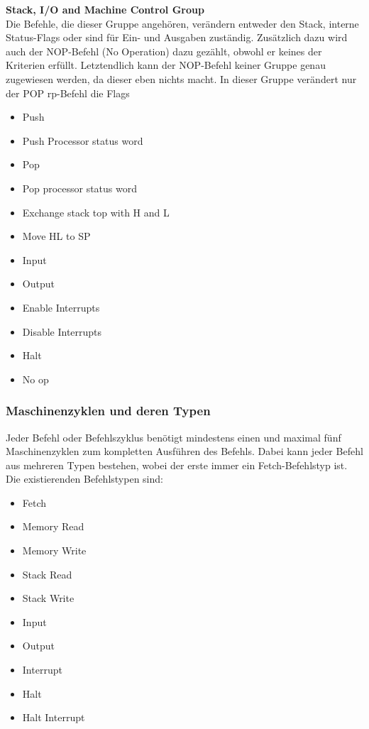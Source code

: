 \documentclass[12pt]{article}
\begin{document}
\vspace{10pt}
\noindent
\textbf{Stack, I/O and Machine Control Group}\\
Die Befehle, die dieser Gruppe angehören, verändern entweder den Stack, interne Status-Flags oder sind für Ein- und Ausgaben zuständig. Zusätzlich dazu wird auch der NOP-Befehl (No Operation) dazu gezählt, obwohl er keines der Kriterien erfüllt. Letztendlich kann der NOP-Befehl keiner Gruppe genau zugewiesen werden, da dieser eben nichts macht.
In dieser Gruppe verändert nur der POP rp-Befehl die Flags

\begin{multicols}{2}
\begin{itemize}
\item Push
\item Push Processor status word
\item Pop
\item Pop processor status word
\item Exchange stack top with H and L
\item Move HL to SP
\item Input
\item Output
\item Enable Interrupts
\item Disable Interrupts
\item Halt
\item No op
\end{itemize}
\end{multicols}


\subsubsection{Maschinenzyklen und deren Typen}
Jeder Befehl oder Befehlszyklus benötigt mindestens einen und maximal fünf Maschinenzyklen zum kompletten Ausführen des Befehls. Dabei kann jeder Befehl aus mehreren Typen bestehen, wobei der erste immer ein Fetch-Befehlstyp ist. Die existierenden Befehlstypen sind:

\begin{itemize}
\item Fetch
\item Memory Read
\item Memory Write
\item Stack Read
\item Stack Write
\item Input
\item Output
\item Interrupt
\item Halt
\item Halt Interrupt
\end{itemize}
\end{document}
